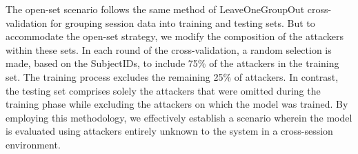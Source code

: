 The open-set scenario follows the same method of LeaveOneGroupOut cross-validation for grouping session data into training and testing sets. But to accommodate the open-set strategy, we modify the composition of the attackers within these sets. In each round of the cross-validation, a random selection is made, based on the SubjectIDs, to include 75$\%$ of the attackers in the training set. The training process excludes the remaining 25$\%$ of attackers. In contrast, the testing set comprises solely the attackers that were omitted during the training phase while excluding the attackers on which the model was trained. By employing this methodology, we effectively establish a scenario wherein the model is evaluated using attackers entirely unknown to the system in a cross-session environment. 






